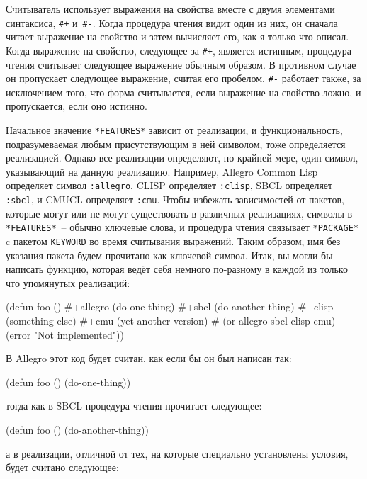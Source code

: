 Считыватель использует выражения на свойства вместе с двумя элементами синтаксиса,
\lstinline!#+! и~\lstinline!#-!. Когда процедура чтения видит один из них, он сначала читает
выражение на свойство и затем вычисляет его, как я только что описал. Когда выражение на
свойство, следующее за \lstinline!#+!, является истинным, процедура чтения считывает следующее
выражение обычным образом. В противном случае он пропускает следующее выражение, считая
его пробелом. \lstinline!#-! работает также, за исключением того, что форма считывается,
если выражение на свойство ложно, и пропускается, если оно истинно.

Начальное значение \lstinline{*FEATURES*} зависит от реализации, и функциональность,
подразумеваемая любым присутствующим в ней символом, тоже определяется реализацией. Однако
все реализации определяют, по крайней мере, один символ, указывающий на данную реализацию.
Например, Allegro Common Lisp определяет символ \lstinline{:allegro}, CLISP определяет
\lstinline{:clisp}, SBCL определяет \lstinline{:sbcl}, и CMUCL определяет
\lstinline{:cmu}.  Чтобы избежать зависимостей от пакетов, которые могут или не могут
существовать в различных реализациях, символы в \lstinline{*FEATURES*}~-- обычно ключевые
слова, и процедура чтения связывает \lstinline{*PACKAGE*} c пакетом \lstinline{KEYWORD} во
время считывания выражений. Таким образом, имя без указания пакета будем прочитано как
ключевой символ. Итак, вы могли бы написать функцию, которая ведёт себя немного по-разному
в каждой из только что упомянутых реализаций:

\begin{myverb}
(defun foo ()
  #+allegro (do-one-thing)
  #+sbcl (do-another-thing)
  #+clisp (something-else)
  #+cmu (yet-another-version)
  #-(or allegro sbcl clisp cmu) (error "Not implemented"))
\end{myverb}

\noindent{}В Allegro этот код будет считан, как если бы он был написан так:

\begin{myverb}
(defun foo ()
  (do-one-thing))
\end{myverb}

\noindent{}тогда как в SBCL процедура чтения прочитает следующее:

\begin{myverb}
(defun foo ()
  (do-another-thing))
\end{myverb}

\noindent{}а в реализации, отличной от тех, на которые специально установлены условия, будет считано
следующее:

